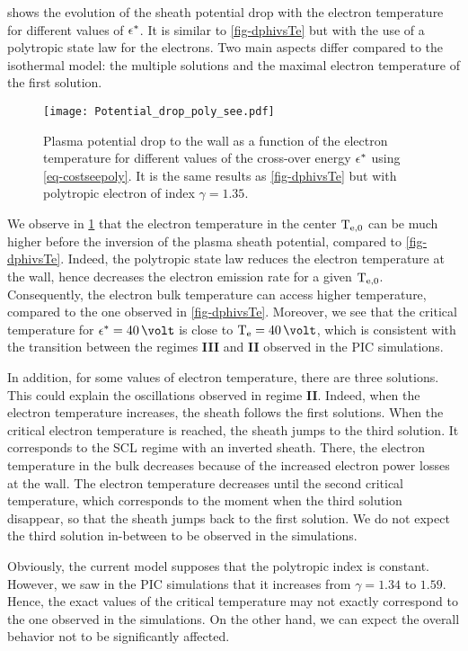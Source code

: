  shows the evolution of the sheath potential drop with the electron temperature for different values of $\epsilon^{*}$.
It is similar to \cref{fig-dphivsTe} but with the use of a polytropic state law for the electrons.
Two main aspects differ compared to the isothermal model\string: the multiple solutions and the maximal electron temperature of the first solution.

\begin{figure}[hbt]
  \centering
  \texttt{[image: Potential\_drop\_poly\_see.pdf]}
  \caption{ Plasma potential drop to the wall as a function of the electron temperature for different values of the cross-over energy $\epsilon^{*}$ using \cref{eq-costseepoly}. It is the same results as  \cref{fig-dphivsTe} but with polytropic electron of index $\gamma=1.35$.}
  \label{fig-rso_crit_see}
\end{figure}

We observe in \cref{fig-rso_crit_see} that the electron temperature in the center $\mathrm{T_{e, 0}}$ can be much higher before the inversion of the plasma sheath potential, compared to \cref{fig-dphivsTe}.
Indeed, the polytropic state law reduces the electron temperature at the wall, hence decreases the electron emission rate for a given $\mathrm{T_{e, 0}}$.
Consequently, the electron bulk temperature can access higher temperature, compared to the one observed in \cref{fig-dphivsTe}.
Moreover, we see that the critical temperature for $\crover=40 \,\volt$ is close to $\Te=40\,\volt$, which is consistent with the transition between the regimes {\bf III} and {\bf II} observed in the \ac{PIC} simulations.

In addition, for some values of electron temperature, there are three solutions.
This could explain the oscillations observed in regime {\bf II}.
Indeed, when the electron temperature increases, the sheath follows the first solutions.
When the critical electron temperature is reached, the sheath jumps to the third solution.
It corresponds to the \ac{SCL} regime with an inverted sheath.
There, the electron temperature in the bulk decreases because of the increased electron power losses at the wall.
The electron temperature decreases until the second critical temperature, which corresponds to the moment when the third solution disappear, so that the sheath jumps back to the first solution.
We do not expect the third solution in-between to be observed in the simulations.

Obviously, the current model supposes that the polytropic index is constant.
However, we saw in the \ac{PIC} simulations that it increases from $\gamma = 1.34$ to $1.59$.
Hence, the exact values of the critical temperature may not exactly correspond to the one observed in the simulations.
On the other hand, we can expect the overall behavior not to be significantly affected.

